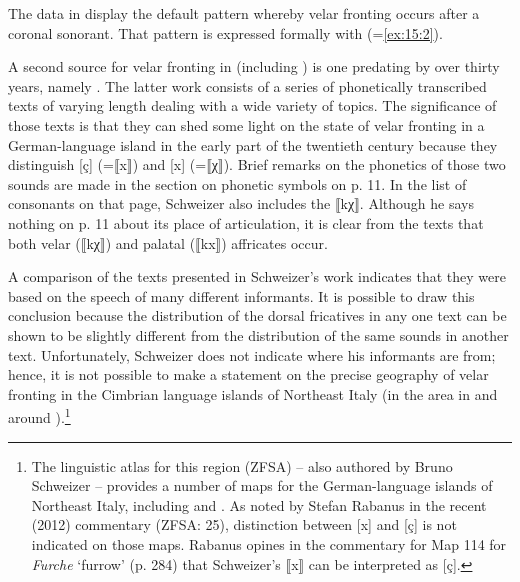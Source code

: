 {The data in  display the default pattern whereby velar fronting occurs after a coronal sonorant. That pattern is expressed formally with  (=\ref{ex:15:2}).

A second source for velar fronting in  (including ) is one predating \citet{Mayer1971} by over thirty years, namely \citet{Schweizer1939}. The latter work consists of a series of phonetically transcribed texts of varying length dealing with a wide variety of topics. The significance of those texts is that they can shed some light on the state of velar fronting in a German-language island in the early part of the twentieth century because they distinguish [ç] (=⟦x⟧) and [x] (=⟦χ⟧). Brief remarks on the phonetics of those two sounds are made in the section on phonetic symbols on p. 11. In the list of consonants on that page, Schweizer also includes the  ⟦kχ⟧. Although he says nothing on p. 11 about its place of articulation, it is clear from the texts that both velar (⟦kχ⟧) and palatal (⟦kx⟧) affricates occur.

A comparison of the texts presented in Schweizer’s work indicates that they were based on the speech of many different informants. It is possible to draw this conclusion because the distribution of the dorsal fricatives in any one text can be shown to be slightly different from the distribution of the same sounds in another text. Unfortunately, Schweizer does not indicate where his informants are from; hence, it is not possible to make a statement on the precise geography of velar fronting in the Cimbrian language islands of Northeast Italy (in the area in and around ).\footnote{{The linguistic atlas for this region (ZFSA) -- also authored by Bruno Schweizer -- provides a number of maps for the German-language islands of Northeast Italy, including  and . As noted by Stefan Rabanus in the recent (2012) commentary (ZFSA: 25),  distinction between [x] and [ç] is not indicated on those maps. Rabanus opines in the commentary for Map 114 for} \textrm{\textit{Furche}} \textrm{‘furrow’ (p. 284) that Schweizer’s ⟦x⟧ can be interpreted as [ç].}}

}
